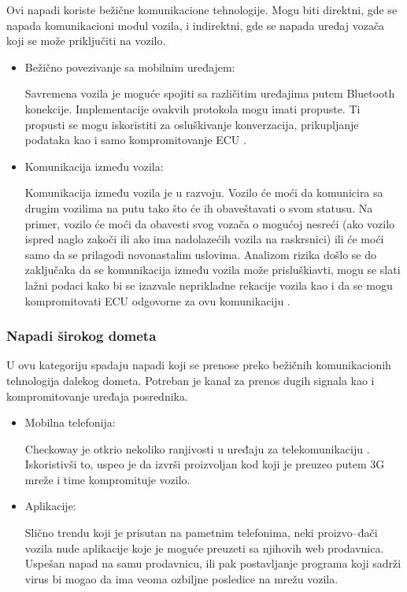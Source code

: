 \documentclass[a4paper]{article}
\begin{document}
Ovi napadi koriste bežične komunikacione tehnologije. Mogu biti direktni, gde se napada komunikacioni modul vozila, i indirektni, gde se napada uređaj vozača koji se može priključiti na vozilo.
  \begin{itemize}
  	\item Bežično povezivanje sa mobilnim uređajem:
    
    Savremena vozila je moguće spojiti sa različitim uređajima putem Bluetooth konekcije. Implementacije ovakvih protokola mogu imati propuste. Ti propusti se mogu iskoristiti za osluškivanje konverzacija, prikupljanje podataka kao i samo kompromitovanje ECU \cite{Checkoway}.

    \item Komunikacija između vozila:
    
    Komunikacija između vozila je u razvoju. Vozilo će moći da komunicira sa drugim vozilima na putu tako što će ih obaveštavati o svom statusu. Na primer, vozilo će moći da obavesti svog vozača o mogućoj nesreći (ako vozilo ispred naglo zakoči ili ako ima nadolazećih vozila na raskrsnici) ili će moći samo da se prilagodi novonastalim uslovima. Analizom rizika došlo se do zaključaka da se komunikacija između vozila može prisluškiavti, mogu se slati lažni podaci kako bi se izazvale neprikladne rekacije vozila kao i da se mogu kompromitovati ECU odgovorne za ovu komunikaciju \cite{6463997}.
  \end{itemize}

\subsubsection{Napadi širokog dometa}
\label{subsubsec: napadisiroko}

U ovu kategoriju spadaju napadi koji se prenose preko bežičnih komunikacionih tehnologija dalekog dometa. Potreban je kanal za prenos dugih signala kao i kompromitovanje uređaja posrednika.

  \begin{itemize}
  	\item Mobilna telefonija:
    
    Checkoway je otkrio nekoliko ranjivosti u uređaju za telekomunikaciju \cite{Checkoway}. Iskoristivši to, uspeo je da izvrši proizvoljan kod koji je preuzeo putem 3G mreže i time kompromituje vozilo.
    
    \item Aplikacije:
    
    Slično trendu koji je prisutan na pametnim telefonima, neki proizvo--đači vozila nude aplikacije koje je moguće preuzeti sa njihovih web prodavnica. Uspešan napad na samu prodavnicu, ili pak postavljanje programa koji sadrži virus bi mogao da ima veoma ozbiljne posledice na mrežu vozila.
  \end{itemize}
\end{document}
